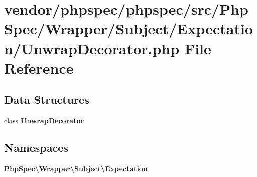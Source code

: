 \section{vendor/phpspec/phpspec/src/\+Php\+Spec/\+Wrapper/\+Subject/\+Expectation/\+Unwrap\+Decorator.php File Reference}
\label{_unwrap_decorator_8php}
\subsection*{Data Structures}
\begin{DoxyCompactItemize}
\item 
class {\bf Unwrap\+Decorator}
\end{DoxyCompactItemize}
\subsection*{Namespaces}
\begin{DoxyCompactItemize}
\item 
 {\bf Php\+Spec\textbackslash{}\+Wrapper\textbackslash{}\+Subject\textbackslash{}\+Expectation}
\end{DoxyCompactItemize}
